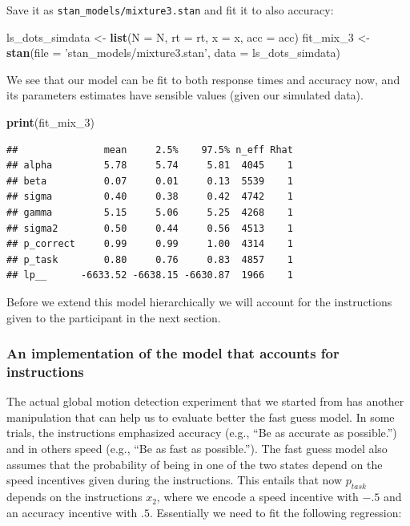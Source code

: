 \documentclass[12pt,]{krantz}
\newenvironment{Shaded}{\begin{snugshade}}{\end{snugshade}}
\newcommand{\KeywordTok}[1]{\textcolor[rgb]{0.13,0.29,0.53}{\textbf{#1}}}
\newcommand{\DataTypeTok}[1]{\textcolor[rgb]{0.13,0.29,0.53}{#1}}
\newcommand{\DecValTok}[1]{\textcolor[rgb]{0.00,0.00,0.81}{#1}}
\newcommand{\StringTok}[1]{\textcolor[rgb]{0.31,0.60,0.02}{#1}}
\newcommand{\NormalTok}[1]{#1}
\theoremstyle{definition}
\theoremstyle{definition}
\theoremstyle{definition}
\theoremstyle{remark}
\begin{document}
Save it as \texttt{stan\_models/mixture3.stan} and fit it to also
accuracy:

\begin{Shaded}
\begin{Highlighting}[]
\NormalTok{ls_dots_simdata <-}\StringTok{ }\KeywordTok{list}\NormalTok{(}\DataTypeTok{N =}\NormalTok{ N,}
                        \DataTypeTok{rt =}\NormalTok{ rt,}
                        \DataTypeTok{x =}\NormalTok{ x,}
                        \DataTypeTok{acc =}\NormalTok{ acc)}
\NormalTok{fit_mix_}\DecValTok{3}\NormalTok{ <-}\StringTok{ }\KeywordTok{stan}\NormalTok{(}\DataTypeTok{file =} \StringTok{'stan_models/mixture3.stan'}\NormalTok{,}
               \DataTypeTok{data =}\NormalTok{ ls_dots_simdata) }
\end{Highlighting}
\end{Shaded}

We see that our model can be fit to both response times and accuracy
now, and its parameters estimates have sensible values (given our
simulated data).

\begin{Shaded}
\begin{Highlighting}[]
\KeywordTok{print}\NormalTok{(fit_mix_}\DecValTok{3}\NormalTok{)}
\end{Highlighting}
\end{Shaded}

\begin{verbatim}
##               mean     2.5%    97.5% n_eff Rhat
## alpha         5.78     5.74     5.81  4045    1
## beta          0.07     0.01     0.13  5539    1
## sigma         0.40     0.38     0.42  4742    1
## gamma         5.15     5.06     5.25  4268    1
## sigma2        0.50     0.44     0.56  4513    1
## p_correct     0.99     0.99     1.00  4314    1
## p_task        0.80     0.76     0.83  4857    1
## lp__      -6633.52 -6638.15 -6630.87  1966    1
\end{verbatim}

Before we extend this model hierarchically we will account for the
instructions given to the participant in the next section.

\subsubsection{An implementation of the model that accounts for
instructions}\label{an-implementation-of-the-model-that-accounts-for-instructions}

The actual global motion detection experiment that we started from has
another manipulation that can help us to evaluate better the fast guess
model. In some trials, the instructions emphasized accuracy (e.g., ``Be
as accurate as possible.'') and in others speed (e.g., ``Be as fast as
possible.''). The fast guess model also assumes that the probability of
being in one of the two states depend on the speed incentives given
during the instructions. This entails that now \(p_{task}\) depends on
the instructions \(x_2\), where we encode a speed incentive with \(-.5\)
and an accuracy incentive with \(.5\). Essentially we need to fit the
following regression:
\end{document}

